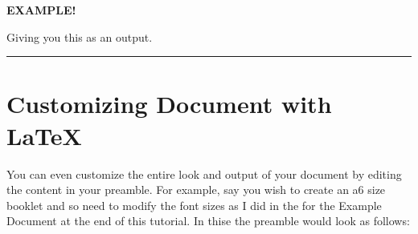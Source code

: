 \documentclass[
]{book}
\newenvironment{blackbox}{
  \definecolor{shadecolor}{rgb}{0, 0, 0}  %
  \color{white}
  \begin{shaded}}
 {\end{shaded}}
\theoremstyle{definition}
\theoremstyle{definition}
\theoremstyle{definition}
\theoremstyle{definition}
\theoremstyle{remark}
\begin{document}
\begin{blackbox}

\begin{center}
\textbf{EXAMPLE!}

\end{center}

Giving you this as an output.

\end{blackbox}

\begin{center}\rule{0.5\linewidth}{0.5pt}\end{center}

\section{Customizing Document with LaTeX}\label{customizing-document-with-latex}

You can even customize the entire look and output of your document by editing the content in your preamble. For example, say you wish to create an a6 size booklet and so need to modify the font sizes as I did in the for the Example Document at the end of this tutorial. In thise the preamble would look as follows:
\end{document}
